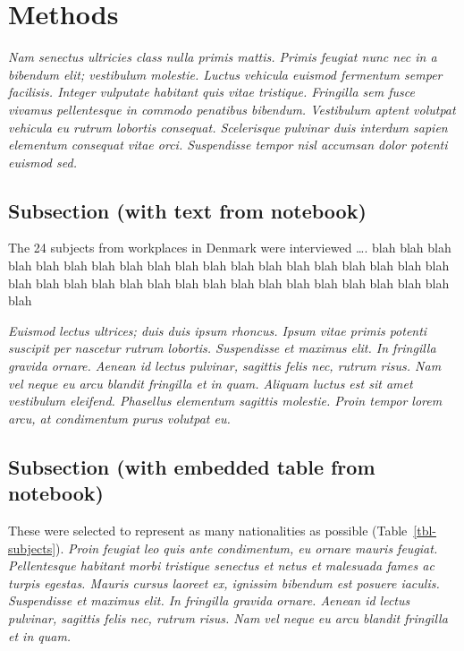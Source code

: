 \documentclass[
  a4paper,
]{scrbook}
\let\oldemph\emph
\renewcommand\emph[1]{\oldemph{\color{gray}#1}}
\begin{document}
\chapter{Methods}\label{methods}

\emph{Nam senectus ultricies class nulla primis mattis. Primis feugiat
nunc nec in a bibendum elit; vestibulum molestie. Luctus vehicula
euismod fermentum semper facilisis. Integer vulputate habitant quis
vitae tristique. Fringilla sem fusce vivamus pellentesque in commodo
penatibus bibendum. Vestibulum aptent volutpat vehicula eu rutrum
lobortis consequat. Scelerisque pulvinar duis interdum sapien elementum
consequat vitae orci. Suspendisse tempor nisl accumsan dolor potenti
euismod sed.}

\section{Subsection (with text from
notebook)}\label{subsection-with-text-from-notebook}

\label{doc-sampling}
The 24 subjects from workplaces in Denmark were interviewed \ldots. blah
blah blah blah blah blah blah blah blah blah blah blah blah blah blah
blah blah blah blah blah blah blah blah blah blah blah blah blah blah
blah blah blah blah blah blah blah

\emph{Euismod lectus ultrices; duis duis ipsum rhoncus. Ipsum vitae
primis potenti suscipit per nascetur rutrum lobortis. Suspendisse et
maximus elit. In fringilla gravida ornare. Aenean id lectus pulvinar,
sagittis felis nec, rutrum risus. Nam vel neque eu arcu blandit
fringilla et in quam. Aliquam luctus est sit amet vestibulum eleifend.
Phasellus elementum sagittis molestie. Proin tempor lorem arcu, at
condimentum purus volutpat eu.}

\section{Subsection (with embedded table from
notebook)}\label{subsection-with-embedded-table-from-notebook}

These were selected to represent as many nationalities as possible
(Table~\ref{tbl-subjects}). \emph{Proin feugiat leo quis ante
condimentum, eu ornare mauris feugiat. Pellentesque habitant morbi
tristique senectus et netus et malesuada fames ac turpis egestas. Mauris
cursus laoreet ex, ignissim bibendum est posuere iaculis. Suspendisse et
maximus elit. In fringilla gravida ornare. Aenean id lectus pulvinar,
sagittis felis nec, rutrum risus. Nam vel neque eu arcu blandit
fringilla et in quam.}
\end{document}
